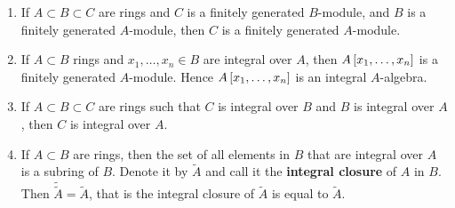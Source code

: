\begin{lemma}
\label{lem:14.3}
\hfill
\begin{enumerate}
\item If $ A \subset B \subset C $ are rings and $ C $ is a finitely generated $ B $-module, and $ B $ is a finitely generated $ A $-module, then $ C $ is a finitely generated $ A $-module.
\item If $ A \subset B $ rings and $ x_1, \dots, x_n \in B $ are integral over $ A $, then $ A\sbr{x_1, \dots, x_n} $ is a finitely generated $ A $-module. Hence $ A\sbr{x_1, \dots, x_n} $ is an integral $ A $-algebra.
\item If $ A \subset B \subset C $ are rings such that $ C $ is integral over $ B $ and $ B $ is integral over $ A $, then $ C $ is integral over $ A $.
\item If $ A \subset B $ are rings, then the set of all elements in $ B $ that are integral over $ A $ is a subring of $ B $. Denote it by $ \widetilde{A} $ and call it the \textbf{integral closure} of $ A $ in $ B $. Then $ \widetilde{\widetilde{A}} = \widetilde{A} $, that is the integral closure of $ \widetilde{A} $ is equal to $ \widetilde{A} $.
\end{enumerate}
\end{lemma}

\pagebreak

